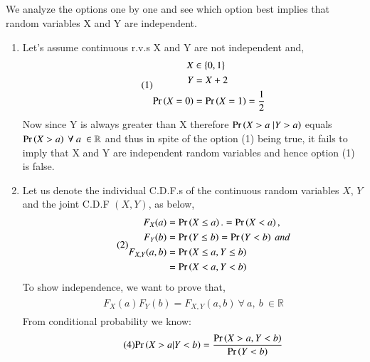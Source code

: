 \documentclass[journal,12pt,twocolumn]{IEEEtran}
\begin{document}
\subsection*{}
We analyze the options one by one and see which option best implies that random variables X and Y are independent. \\
\begin{enumerate}
    \item Let's assume continuous r.v.s X and Y are not independent and, \\
\begin{align}\tag{1}
    \begin{split}
        X &\in \{0, 1\}\\
        Y &= X + 2\\
        \Pr\left(X=0\right) &= \Pr\left(X=1\right) = \dfrac{1}{2}\\
    \end{split}
\end{align}
Now since Y is always greater than X therefore $\Pr\left(X>a \;| Y>a\right)$ equals $\Pr\left(X > a\right)\ \forall\ a\ \in \mathbb{R}$ and thus in spite of the option (1) being true, it fails to imply that X and Y are independent random variables and hence option (1) is false.\\
    \item Let us denote the individual C.D.F.s of the continuous random variables $X$, $Y$ and the joint C.D.F $(X, Y)$, as below,\\
\begin{align}\tag{2}
    \begin{split}
        F_X(a) &= \Pr\left(X \leq a\right) .= \Pr\left(X < a\right),\\
        F_Y(b) &= \Pr\left(Y \leq b\right) = \Pr\left(Y < b\right)\ and \\
        F_{X,Y}(a,b) &= \Pr\left(X \leq a, Y \leq b\right)\\
                     &= \Pr\left(X < a, Y < b\right)
    \end{split}
\end{align}
To show independence, we want to prove that,
\begin{align}\tag{3}
    \begin{split}
        F_X(a)F_Y(b) = F_{X, Y}(a,b)\ \forall\ a,\ b\ \in \mathbb{R}
    \end{split}
\end{align}
From conditional probability we know: 
\begin{align}\tag{4}
    \begin{split}
        \pr{X > a | Y < b} = \frac{\pr{X > a, Y < b}}{\pr{Y < b}}

\end{split}
\end{align}
\end{enumerate}
\end{document}
